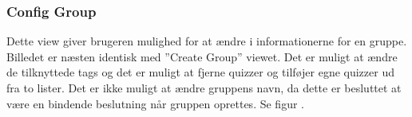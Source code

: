 \subsubsection{Config Group}
Dette view giver brugeren mulighed for at ændre i informationerne for en gruppe. Billedet er næsten identisk med ''Create Group'' viewet. Det er muligt at ændre de tilknyttede tags og det er muligt at fjerne quizzer og tilføjer egne quizzer ud fra to lister. Det er ikke muligt at ændre gruppens navn, da dette er besluttet at være en bindende beslutning når gruppen oprettes. Se figur .


